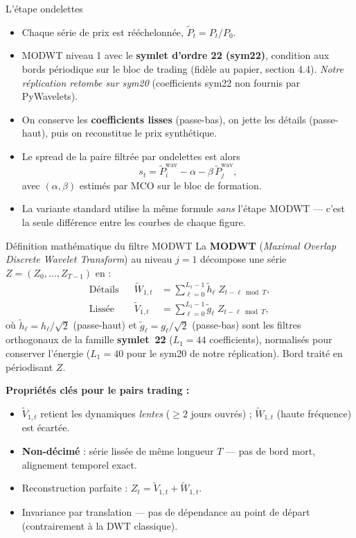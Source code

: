 \documentclass[10pt,aspectratio=169]{beamer}
\begin{document}
\begin{frame}{L'étape ondelettes}
  \begin{itemize}
    \item Chaque série de prix est rééchelonnée, $\tilde{P}_t = P_t / P_0$.
    \item MODWT niveau 1 avec le \textbf{symlet d'ordre 22 (sym22)}, condition
          aux bords périodique sur le bloc de trading (fidèle au papier,
          section 4.4). \textit{Notre réplication retombe sur sym20}
          (coefficients sym22 non fournis par PyWavelets).
    \item On conserve les \textbf{coefficients lisses} (passe-bas), on
          jette les détails (passe-haut), puis on reconstitue le prix
          synthétique.
    \item Le spread de la paire filtrée par ondelettes est alors
      \[ s_t = \tilde{P}_i^{\text{wav}} - \alpha - \beta\, \tilde{P}_j^{\text{wav}}, \]
      avec $(\alpha,\beta)$ estimés par MCO sur le bloc de formation.
    \item La variante standard utilise la même formule \emph{sans} l'étape
          MODWT --- c'est la seule différence entre les courbes de chaque figure.
  \end{itemize}
\end{frame}

\begin{frame}{Définition mathématique du filtre MODWT}
  \small
  La \textbf{MODWT} (\textit{Maximal Overlap Discrete Wavelet Transform}) au
  niveau $j=1$ décompose une série $Z = (Z_0,\dots,Z_{T-1})$ en :
  \begin{align*}
    \text{Détails}  &&  \widetilde{W}_{1,t} &= \sum_{\ell=0}^{L_1-1} \tilde{h}_\ell\; Z_{t-\ell \bmod T}, \\[2pt]
    \text{Lissée}   &&  \widetilde{V}_{1,t} &= \sum_{\ell=0}^{L_1-1} \tilde{g}_\ell\; Z_{t-\ell \bmod T},
  \end{align*}
  où $\tilde{h}_\ell = h_\ell/\sqrt{2}$ (passe-haut) et
  $\tilde{g}_\ell = g_\ell/\sqrt{2}$ (passe-bas) sont les filtres orthogonaux
  de la famille \textbf{symlet~22} ($L_1 = 44$ coefficients), normalisés pour
  conserver l'énergie ($L_1 = 40$ pour le sym20 de notre réplication). Bord
  traité en périodisant $Z$.

  \vskip4pt
  \textbf{Propriétés clés pour le pairs trading :}
  \begin{itemize}\setlength{\itemsep}{2pt}
    \item $\widetilde{V}_{1,t}$ retient les dynamiques \emph{lentes}
          ($\geq 2$ jours ouvrés) ; $\widetilde{W}_{1,t}$ (haute fréquence) est écartée.
    \item \textbf{Non-décimé} : série lissée de même longueur $T$ --- pas de bord
          mort, alignement temporel exact.
    \item Reconstruction parfaite : $Z_t = \widetilde{V}_{1,t} + \widetilde{W}_{1,t}$.
    \item Invariance par translation --- pas de dépendance au point de départ
          (contrairement à la DWT classique).
  \end{itemize}
\end{frame}
\end{document}
